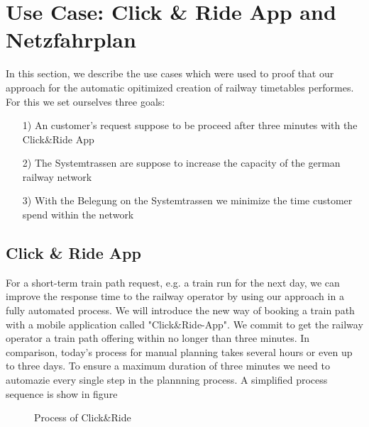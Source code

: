 \section{Use Case: Click \& Ride App and Netzfahrplan}
\label{chap:useCases}
In this section, we describe the use cases which were used to proof that our approach for the automatic opitimized creation of railway timetables performes. For this we set ourselves three goals: 

\begin{itemize}
	\item[1)] An customer's request suppose to be proceed after three minutes with the Click\&Ride App
	\item[2)] The Systemtrassen are suppose to increase the capacity of the german railway network
	\item[3)] With the Belegung on the Systemtrassen we minimize the time customer spend within the network
\end{itemize}

\subsection{Click \& Ride App}
\label{chap:CnR}
For a short-term train path request, e.g. a train run for the next day, we can improve the response time to the railway operator by using our approach in a fully automated process. We will introduce the new way of booking a train path with a mobile application called "Click\&Ride-App". We commit to get the railway operator a train path offering within no longer than three minutes. In comparison, today's process for manual planning takes several hours or even up to three days. To ensure a maximum duration of three minutes we need to automazie every single step in the plannning process. A simplified process sequence is show in figure 

%
\begin{figure}[tb]
	\centering
	\caption{Process of Click\&Ride}
	\label{fig:process_sequence}
\end{figure}

